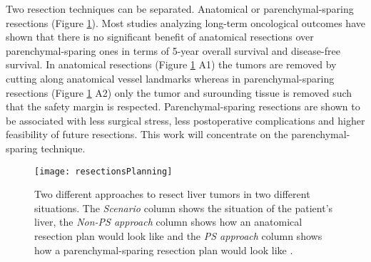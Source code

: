 Two resection techniques can be separated. Anatomical or parenchymal-sparing
resections (Figure \ref{fig:resectionsPlanning}). Most studies analyzing
long-term oncological outcomes have shown that there is no significant benefit
of anatomical resections over parenchymal-sparing ones in terms of 5-year overall
survival and disease-free survival. In anatomical resections
(Figure \ref{fig:resectionsPlanning} A1) the tumors are removed by cutting along
anatomical vessel landmarks whereas in parenchymal-sparing resections (Figure
\ref{fig:resectionsPlanning} A2) only the tumor and surounding tissue is removed
such that the safety margin is respected. Parenchymal-sparing resections are
shown to be associated with less surgical stress, less postoperative
complications and higher feasibility of future resections. This work will concentrate on the parenchymal-sparing technique. 
\begin{figure}[H]
  \centering
 \texttt{[image: resectionsPlanning]}
  \caption{Two different approaches to resect liver tumors in two different
    situations. The \textit{Scenario} column shows the situation of the
    patient's liver, the \textit{Non-PS approach} column shows how an anatomical
  resection plan would look like and the \textit{PS approach} column shows how a
parenchymal-sparing resection plan would look like \cite{alvarez2016parenchymal}.}
  \label{fig:resectionsPlanning}
\end{figure}


